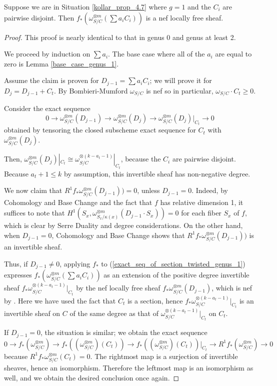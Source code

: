 \begin{lemma}\label{inductive_step_genus_1}
Suppose we are in Situation \ref{kollar_prop_4.7} where $g=1$ and the $C_i$ are pairwise disjoint.
Then $f_{*}(\omega_{S/C}^{\otimes m}(\sum a_iC_i))$ is a nef locally free sheaf.
\end{lemma}
\begin{proof}
This proof is nearly identical to that in genus 0 and genus at least 2.

We proceed by induction on $\sum a_i$.
The base case where all of the $a_i$ are equal to zero is Lemma \ref{base_case_genus_1}.

Assume the claim is proven for $D_{j-1}=\sum a_iC_i$; we will prove it for $D_{j}=D_{j-1}+C_t$.
By Bombieri-Mumford $\omega_{S/C}$ is nef so in particular, $\omega_{S/C}\cdot C_t\ge0$.

Consider the exact sequence
\begin{equation}\label{exact_seq_of_section_twisted_genus_1}
0\to\omega_{S/C}^{\otimes m}(D_{j-1})\to\omega_{S/C}^{\otimes m}(D_j)\to \omega_{S/C}^{\otimes m}(D_j)|_{C_t}\to0
\end{equation}
obtained by tensoring the closed subscheme exact sequence for $C_t$ with $\omega_{S/C}^{\otimes m}(D_j)$.

Then, $\omega_{S/C}^{\otimes m}(D_j)|_{C_t}\cong \omega_{S/C}^{\otimes (k-a_{t}-1)}|_{C_t}$, because the $C_i$ are pairwise disjoint.
Because $a_{t}+1\le k$ by assumption, this invertible sheaf has non-negative degree.

We now claim that $R^{1}f_{*}\omega_{S/C}^{\otimes m}(D_{j-1}))=0$, unless $D_{j-1}=0$.
Indeed, by Cohomology and Base Change and the fact that $f$ has relative dimension 1, it suffices to note that $H^{1}(S_x,\omega_{S_x/\kappa(x)}^{\otimes m}(D_{j-1}\cdot S_x))=0$ for each fiber $S_x$ of $f$, which is clear by Serre Duality and degree considerations.
On the other hand, when $D_{j-1}=0$, Cohomology and Base Change shows that $R^{1}f_{*}\omega_{S/C}^{\otimes m}(D_{j-1}))$ is an invertible sheaf.


Thus, if $D_{j-1}\neq0$, applying $f_{*}$ to (\ref{exact_seq_of_section_twisted_genus_1}) expresses $f_{*}(\omega_{S/C}^{\otimes m}(\sum a_iC_i))$ as an extension of the positive degree invertible sheaf $f_{*}\omega_{S/C}^{\otimes (k-a_{t}-1)}|_{C_t}$ by the nef locally free sheaf $f_{*}\omega_{S/C}^{\otimes m}(D_{j-1})$, which is nef by .
Here we have used the fact that $C_t$ is a section, hence $f_{*}\omega_{S/C}^{\otimes (k-a_{t}-1)}|_{C_t}$ is an invertible sheaf on $C$ of the same degree as that of $\omega_{S/C}^{\otimes (k-a_{t}-1)}|_{C_t}$ on $C_t$.

If $D_{j-1}=0$, the situation is similar; we obtain the exact sequence
$$
0\to f_{*}(\omega_{S/C}^{\otimes m})\to f_{*}((\omega_{S/C}^{\otimes m})(C_t))\to f_{*}((\omega_{S/C}^{\otimes m})(C_t))|_{C_t}\to R^{1}f_{*}(\omega_{S/C}^{\otimes m})\to0
$$
because $R^{1}f_{*}\omega_{S/C}^{\otimes m}(C_t)=0$.
The rightmost map is a surjection of invertible sheaves, hence an isomorphism.
Therefore the leftmost map is an isomorphism as well, and we obtain the desired conclusion once again.
\end{proof}



